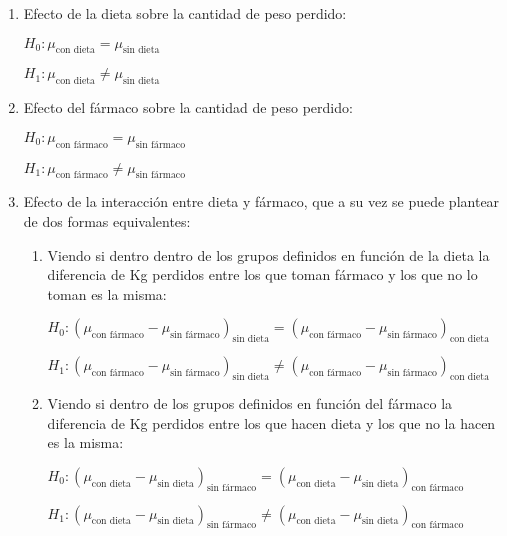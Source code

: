 \begin{enumerate}

\item Efecto de la dieta sobre la cantidad de peso perdido:

$H_0: \mu_{\text{con dieta}}=\mu_{\text{sin dieta}}$

$H_1: \mu_{\text{con dieta}}\neq\mu_{\text{sin dieta}}$

\item Efecto del fármaco sobre la cantidad de peso perdido:

$H_0: \mu_{\text{con fármaco}}=\mu_{\text{sin fármaco}}$

$H_1: \mu_{\text{con fármaco}}\neq\mu_{\text{sin fármaco}}$

\item Efecto de la interacción entre dieta y fármaco, que a su vez se puede plantear de dos formas equivalentes:

\begin{enumerate}
\item Viendo si dentro dentro de los grupos definidos en función de la dieta la diferencia de Kg perdidos entre los que toman fármaco y los que no lo toman es la misma:

$H_0: (\mu_{\text{con fármaco}}-\mu_{\text{sin fármaco}})_{\text{sin dieta}}=(\mu_{\text{con fármaco}}-\mu_{\text{sin fármaco}})_{\text{con dieta}}$

$H_1: (\mu_{\text{con fármaco}}-\mu_{\text{sin fármaco}})_{\text{sin dieta}}\neq(\mu_{\text{con fármaco}}-\mu_{\text{sin fármaco}})_{\text{con dieta}}$

\item Viendo si dentro de los grupos definidos en función del fármaco la diferencia de Kg perdidos entre los que hacen dieta y los que no la hacen es la misma:

$H_0: (\mu_{\text{con dieta}}-\mu_{\text{sin dieta}})_{\text{sin fármaco}}=(\mu_{\text{con dieta}}-\mu_{\text{sin dieta}})_{\text{con fármaco}}$

$H_1: (\mu_{\text{con dieta}}-\mu_{\text{sin dieta}})_{\text{sin fármaco}}\neq(\mu_{\text{con dieta}}-\mu_{\text{sin dieta}})_{\text{con fármaco}}$
\end{enumerate}
\end{enumerate}

